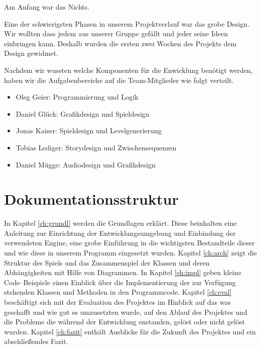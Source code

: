 Am Anfang war das Nichts.

Eine der schwierigsten Phasen in unserem Projektverlauf war das grobe Design. Wir wollten dass  \gamename jedem aus unserer Gruppe gefällt und jeder seine Ideen einbringen kann. Deshalb wurden die ersten zwei Wochen des Projekts dem Design gewidmet. 

Nachdem wir wussten welche Komponenten für die Enwicklung benötigt werden, haben wir die Aufgabenbereiche auf die Team-Mitglieder wie folgt verteilt.

\begin{itemize}

\item Oleg Geier: Programmierung und Logik

\item Daniel Glück: Grafikdesign und Spieldesign

\item Jonas Kaiser: Spieldesign und Levelgenerierung

\item Tobias Lediger: Storydesign und Zwischensequenzen

\item Daniel Mügge: Audiodesign und Grafikdesign
	
\end{itemize}



\section{Dokumentationsstruktur}\label{sec:1_Dokumentationsstruktur}
In Kapitel \ref{ch:grundl} werden die Grundlagen erklärt. Diese beinhalten eine Anleitung zur Einrichtung der Entwicklungsumgebung und Einbindung der verwendeten Engine, eine grobe Einführung in die wichtigsten Bestandteile dieser und wie diese in unserem Programm eingesetzt wurden. 
Kapitel \ref{ch:arch} zeigt die Struktur des Spiels und das Zusammenspiel der Klassen und deren Abhängigkeiten mit Hilfe von Diagrammen.
In Kapitel \ref{ch:impl} geben kleine Code--Beispiele einen Einblick über die Implementierung der zur Verfügung stehenden Klassen und Methoden in den Programmcode.
Kapitel \ref{ch:eval} beschäftigt sich mit der Evaluation des Projektes im Hinblick auf das was geschafft und wie gut es umzusetzten wurde, auf den Ablauf des Projektes und die Probleme die während der Entwicklung enstanden, gelöst oder nicht gelöst wurden.
Kapitel \ref{ch:fazit} enthält Ausblicke für die Zukunft des Projektes und ein abschließendes Fazit.


